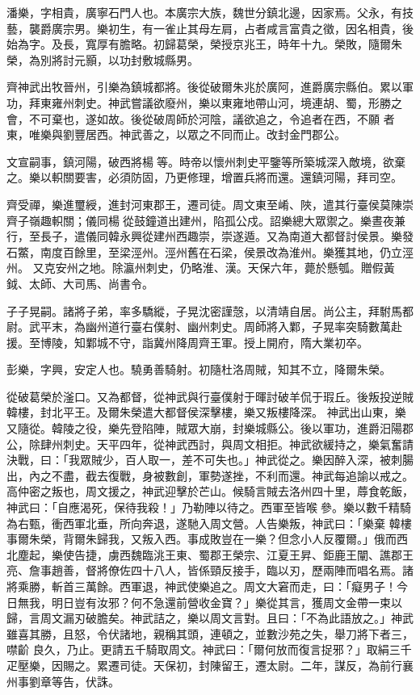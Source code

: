 \begin{pinyinscope}
 潘樂，字相貴，廣寧石門人也。本廣宗大族，魏世分鎮北邊，因家焉。父永，有技藝，襲爵廣宗男。樂初生，有一雀止其母左肩，占者咸言富貴之徵，因名相貴，後始為字。及長，寬厚有膽略。初歸葛榮，榮授京兆王，時年十九。榮敗，隨爾朱榮，為別將討元顥，以功封敷城縣男。



 齊神武出牧晉州，引樂為鎮城都將。後從破爾朱兆於廣阿，進爵廣宗縣伯。累以軍功，拜東雍州刺史。神武嘗議欲廢州，樂以東雍地帶山河，境連胡、蜀，形勝之會，不可棄也，遂如故。後從破周師於河陰，議欲追之，令追者在西，不願
 者東，唯樂與劉豐居西。神武善之，以眾之不同而止。改封金門郡公。



 文宣嗣事，鎮河陽，破西將楊等。時帝以懷州刺史平鑒等所築城深入敵境，欲棄之。樂以軹關要害，必須防固，乃更修理，增置兵將而還。還鎮河陽，拜司空。



 齊受禪，樂進璽綬，進封河東郡王，遷司徒。周文東至崤、陜，遣其行臺侯莫陳崇齊子嶺趣軹關；儀同楊從鼓鐘道出建州，陷孤公戍。詔樂總大眾禦之。樂晝夜兼行，至長子，遣儀同韓永興從建州西趣崇，崇遂遁。又為南道大都督討侯景。樂發石鱉，南度百餘里，至梁涇州。涇州舊在石梁，侯景改為淮州。樂獲其地，仍立涇州。
 又克安州之地。除瀛州刺史，仍略淮、漢。天保六年，薨於懸瓠。贈假黃鉞、太師、大司馬、尚書令。



 子子晃嗣。諸將子弟，率多驕縱，子晃沈密謹愨，以清靖自居。尚公主，拜駙馬都尉。武平末，為幽州道行臺右僕射、幽州刺史。周師將入鄴，子晃率突騎數萬赴援。至博陵，知鄴城不守，詣冀州降周齊王軍。授上開府，隋大業初卒。



 彭樂，字興，安定人也。驍勇善騎射。初隨杜洛周賊，知其不立，降爾朱榮。



 從破葛榮於滏口。又為都督，從神武與行臺僕射于暉討破羊侃于瑕丘。後叛投逆賊韓樓，封北平王。及爾朱榮遣大都督侯深擊樓，樂又叛樓降深。
 神武出山東，樂又隨從。韓陵之役，樂先登陷陣，賊眾大崩，封樂城縣公。後以軍功，進爵汨陽郡公，除肆州刺史。天平四年，從神武西討，與周文相拒。神武欲緩持之，樂氣奮請決戰，曰：「我眾賊少，百人取一，差不可失也。」神武從之。樂因醉入深，被刺腸出，內之不盡，截去復戰，身被數創，軍勢遂挫，不利而還。神武每追諭以戒之。高仲密之叛也，周文援之，神武迎擊於芒山。候騎言賊去洛州四十里，蓐食乾飯，神武曰：「自應渴死，保待我殺！」乃勒陣以待之。西軍至皆喉參。樂以數千精騎為右甄，衝西軍北垂，所向奔退，遂馳入周文營。人告樂叛，神武曰：「樂棄
 韓樓事爾朱榮，背爾朱歸我，又叛入西。事成敗豈在一樂？但念小人反覆爾。」俄而西北塵起，樂使告捷，虜西魏臨洮王東、蜀郡王榮宗、江夏王昇、鉅鹿王闡、譙郡王亮、詹事趙善，督將僚佐四十八人，皆係頸反接手，臨以刃，歷兩陣而唱名焉。諸將乘勝，斬首三萬餘。西軍退，神武使樂追之。周文大窘而走，曰：「癡男子！今日無我，明日豈有汝邪？何不急還前營收金寶？」樂從其言，獲周文金帶一束以歸，言周文漏刃破膽矣。神武詰之，樂以周文言對。且曰：「不為此語放之。」神武雖喜其勝，且怒，令伏諸地，親稱其頭，連頓之，並數沙苑之失，舉刀將下者三，噤齘
 良久，乃止。更請五千騎取周文。神武曰：「爾何放而復言捉邪？」取絹三千疋壓樂，因賜之。累遷司徒。天保初，封陳留王，遷太尉。二年，謀反，為前行襄州事劉章等告，伏誅。




\end{pinyinscope}
